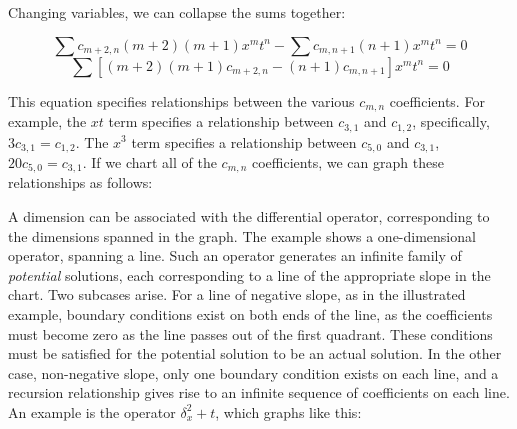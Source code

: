 \documentclass{article}
\begin{document}
Changing variables, we can collapse the sums together:

$$\sum c_{m+2,n} (m+2)(m+1) x^m t^n - \sum c_{m,n+1} (n+1) x^m t^n = 0$$
$$\sum \left[  (m+2)(m+1) c_{m+2,n} -  (n+1) c_{m,n+1} \right] x^m t^n = 0$$

This equation specifies relationships between the various $c_{m,n}$
coefficients.  For example, the $xt$ term specifies a relationship
between $c_{3,1}$ and $c_{1,2}$, specifically, $3c_{3,1}=c_{1,2}$.
The $x^3$ term specifies a relationship between $c_{5,0}$ and $c_{3,1}$,
$20c_{5,0} = c_{3,1}$.
If we chart all of the $c_{m,n}$ coefficients, we can graph these
relationships as follows:

\def\tikzcoefficientgraph{
\pgftransformscale{0.5}
\foreach \x in {0,...,5}
   \foreach \y in {0,...,5}
      \draw (\x,\y) node {.};

\foreach \x in {2,...,5}
   \draw (\x,-1) node [anchor=base] {$x^\x$};
\draw (1,-1) node [anchor=base] {$x$};
\draw (0,-1) node [anchor=base] {1};
\foreach \y in {2,...,5}
   \draw (-0.5,\y) node {$t^\y$};
\draw (-0.5,1) node {$t$};
\draw (-0.5,0) node {1};
}

\begin{center}
\end{center}

A dimension can be associated with the differential operator,
corresponding to the dimensions spanned in the graph.  The example
shows a one-dimensional operator, spanning a line.  Such an operator
generates an infinite family of {\it potential} solutions, each
corresponding to a line of the appropriate slope in the chart.  Two
subcases arise.  For a line of negative slope, as in the illustrated
example, boundary conditions exist on both ends of the line, as the
coefficients must become zero as the line passes out of the first
quadrant.  These conditions must be satisfied for the potential
solution to be an actual solution.  In the other case, non-negative
slope, only one boundary condition exists on each line, and a
recursion relationship gives rise to an infinite sequence of
coefficients on each line.  An example is the operator $\delta_x^2+t$,
which graphs like this:
\end{document}

